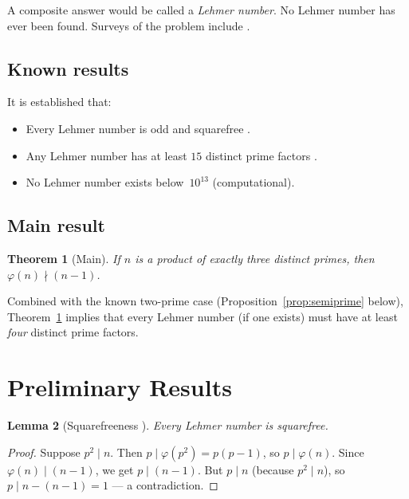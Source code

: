 \documentclass[12pt,a4paper]{amsart}
\newtheorem{theorem}{Theorem}[section]
\newtheorem{lemma}[theorem]{Lemma}
\theoremstyle{definition}
\newcommand{\euler}{\varphi}
\begin{document}
A composite answer would be called a \emph{Lehmer number}.  No Lehmer number
has ever been found.  Surveys of the problem include \cite{Cohen1980,
Hagis1988}.

\subsection{Known results}

It is established that:
\begin{itemize}
  \item Every Lehmer number is odd and squarefree
        \cite{Lehmer1932, Cohen1980}.
  \item Any Lehmer number has at least $15$ distinct prime factors
        \cite{Cohen1980}.
  \item No Lehmer number exists below~$10^{13}$ (computational).
\end{itemize}

\subsection{Main result}

\begin{theorem}[Main]
\label{thm:main}
If $n$ is a product of exactly three distinct primes, then $\euler(n) \nmid (n-1)$.
\end{theorem}

Combined with the known two-prime case (Proposition~\ref{prop:semiprime}
below), Theorem~\ref{thm:main} implies that every Lehmer number (if one exists)
must have at least \emph{four} distinct prime factors.

\section{Preliminary Results}

\begin{lemma}[Squarefreeness \cite{Lehmer1932}]
\label{lem:sqfree}
Every Lehmer number is squarefree.
\end{lemma}

\begin{proof}
Suppose $p^2 \mid n$.  Then $p \mid \euler(p^2) = p(p-1)$, so $p \mid \euler(n)$.
Since $\euler(n) \mid (n-1)$, we get $p \mid (n-1)$.  But $p \mid n$ (because
$p^2 \mid n$), so $p \mid n - (n-1) = 1$ — a contradiction.
\end{proof}
\end{document}
